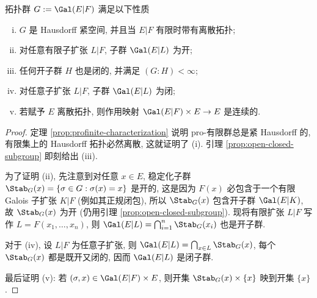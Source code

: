 \begin{lemma}\label{prop:Krull-top-properties}
	拓扑群 $G := \Gal(E|F)$ 满足以下性质
	\begin{enumerate}[(i)]
		\item $G$ 是 Hausdorff 紧空间, 并且当 $E|F$ 有限时带有离散拓扑;
		\item 对任意有限子扩张 $L|F$, 子群 $\Gal(E|L)$ 为开;
		\item 任何开子群 $H$ 也是闭的, 并满足 $(G:H) < \infty$;
		\item 对任意子扩张 $L|F$, 子群 $\Gal(E|L)$ 为闭;
		\item 若赋予 $E$ 离散拓扑, 则作用映射 $\Gal(E|F) \times E \to E$ 是连续的.
	\end{enumerate}
\end{lemma}
\begin{proof}
	定理 \ref{prop:profinite-characterization} 说明 pro-有限群总是紧 Hausdorff 的, 有限集上的 Hausdorff 拓扑必然离散, 这就证明了 (i). 引理 \ref{prop:open-closed-subgroup} 即刻给出 (iii).
	
	为了证明 (ii), 先注意到对任意 $x \in E$, 稳定化子群 $\Stab_G(x) = \{\sigma \in G: \sigma(x)=x \}$ 是开的, 这是因为 $F(x)$ 必包含于一个有限 Galois 子扩张 $K|F$ (例如其正规闭包), 所以 $\Stab_G(x)$ 包含开子群 $\Gal(E|K)$, 故 $\Stab_G(x)$ 为开 (仍用引理 \ref{prop:open-closed-subgroup}). 现将有限扩张 $L|F$ 写作 $L=F(x_1, \ldots, x_n)$, 则 $\Gal(E|L) = \bigcap_{i=1}^n \Stab_G(x_i)$ 也是开子群.
	
	对于 (iv), 设 $L|F$ 为任意子扩张, 则 $\Gal(E|L) = \bigcap_{x \in L} \Stab_G(x)$, 每个 $\Stab_G(x)$ 都是既开又闭的, 因而 $\Gal(E|L)$ 是闭子群.
	
	最后证明 (v): 若 $(\sigma, x) \in \Gal(E|F) \times E$, 则开集 $\Stab_G(x) \times \{x\}$ 映到开集 $\{x\}$.
\end{proof}

